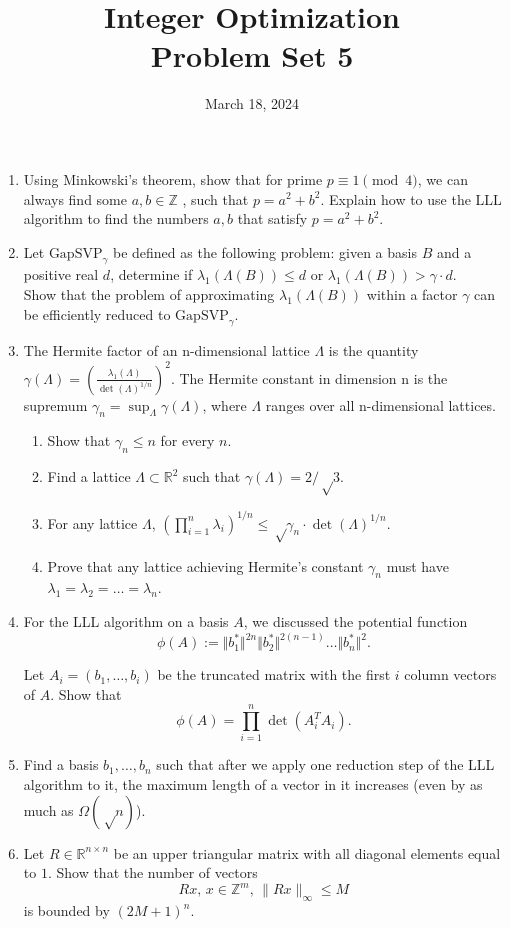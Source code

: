 \documentclass[11pt,a4paper]{article}
\title{Integer Optimization  \\ Problem Set 5 }
\date{ March 18, 2024}
\renewcommand{\leq}{\leqslant}
\begin{document}
\maketitle 


\begin{enumerate}
\item
Using Minkowski's theorem, show that for prime $p\equiv 1 \pmod{4}$, we can always find some $a,b ∈ \mathbb{Z}$ , such that $p=a^2+b^2$. Explain how to use the LLL algorithm to find the numbers $a, b$ that satisfy $p = a^2 + b^2$.

\item Let $\text{GapSVP}_γ$ be defined as the following problem: given a basis $B$ and a positive real $d$, determine if $λ_1(\Lambda(B)) ≤ d$ or $λ_1(\Lambda(B)) > γ\cdot d$.\\
Show that the problem of approximating $λ_1(\Lambda(B))$ within a factor $γ$ can be efficiently reduced to $\text{GapSVP}_γ$.


\item The Hermite factor of an n-dimensional lattice $Λ$ is the quantity $γ(Λ) = \left(\frac{λ_1(Λ)}{ \det(Λ)^{1/n}}\right)^2$. The Hermite constant in dimension n is the supremum $γ_n = \sup_Λ γ(Λ)$, where $Λ$ ranges over all n-dimensional lattices.
\begin{enumerate}
    \item Show that $\gamma_n \leq n$ for every $n$.
    \item Find a lattice $Λ ⊂ \mathbb{R}^2$ such that $γ(Λ) = 2/√3$.
    \item For any lattice $Λ$, $(\prod_{i=1}^n λ_i)^{1/n} ≤ √γ_n \cdot \det(Λ)^{1/n}$.
    \item Prove that any lattice achieving Hermite's constant $\gamma_n$ must have $\lambda_1 = \lambda_2 = \hdots = \lambda_n$. 
\end{enumerate}

\item For the LLL algorithm on a basis $A$, we discussed the potential function 
$$\phi(A) := \Vert b_1^\ast \Vert^{2n} \Vert b_2^\ast \Vert^{2(n-1)} \hdots \Vert b_n^\ast \Vert^{2}.$$

Let $A_i = (b_1, \hdots, b_i)$ be the truncated matrix with the first $i$ column vectors of $A$. Show that $$\phi(A) = \displaystyle\prod_{i = 1}^n \det(A_i^T A_i).$$ 

\item Find a basis $b_1, \hdots , b_n$ such that after we apply one reduction step of the LLL algorithm to it, the maximum length of a vector in it increases (even by as much as $Ω(√n)$).


\item Let $R ∈ ℝ^{n ×n}$ be an upper triangular matrix with all diagonal  elements  equal to $1$. Show that the number of vectors
  \begin{displaymath}
    R x, \, x ∈ℤ^m, \,  \|R x\|_∞ ≤ M 
  \end{displaymath}
  is bounded by $(2M +1)^n$.  


    
\end{enumerate}


%
%


 
\end{document}
